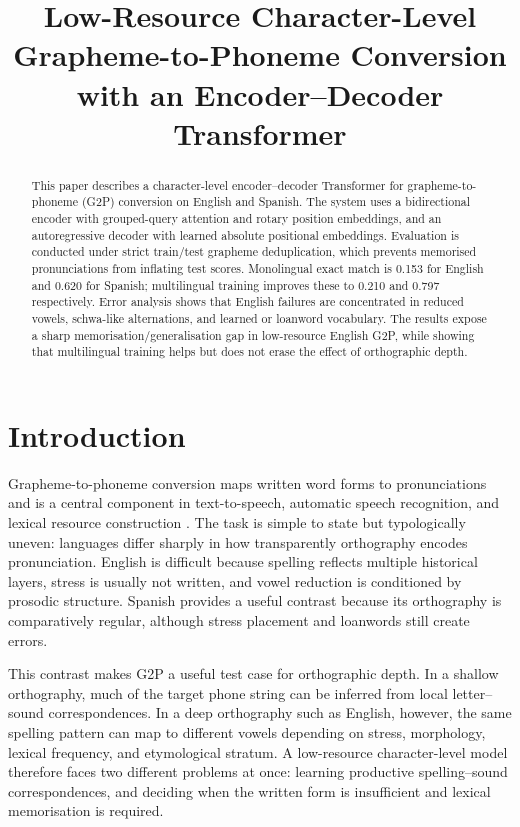 \documentclass[11pt]{article}
\title{Low-Resource Character-Level Grapheme-to-Phoneme Conversion with an Encoder--Decoder Transformer}
\begin{document}
\maketitle

\begin{abstract}
This paper describes a character-level encoder--decoder Transformer for
grapheme-to-phoneme (G2P) conversion on English and Spanish. The system uses a
bidirectional encoder with grouped-query attention and rotary position
embeddings, and an autoregressive decoder with learned absolute positional
embeddings. Evaluation is conducted under strict train/test grapheme
deduplication, which prevents memorised pronunciations from inflating test
scores. Monolingual exact match is 0.153 for English and 0.620 for Spanish;
multilingual training improves these to 0.210 and 0.797 respectively. Error
analysis shows that English failures are concentrated in reduced vowels,
schwa-like alternations, and learned or loanword vocabulary. The results expose
a sharp memorisation/generalisation gap in low-resource English G2P, while
showing that multilingual training helps but does not erase the effect of
orthographic depth.
\end{abstract}

\section{Introduction}
\label{sec:introduction}

Grapheme-to-phoneme conversion maps written word forms to pronunciations and is
a central component in text-to-speech, automatic speech recognition, and lexical
resource construction \citep{cheng2024survey}. The task is simple to state but
typologically uneven: languages differ sharply in how transparently orthography
encodes pronunciation. English is difficult because spelling reflects multiple
historical layers, stress is usually not written, and vowel reduction is
conditioned by prosodic structure. Spanish provides a useful contrast because
its orthography is comparatively regular, although stress placement and
loanwords still create errors.

This contrast makes G2P a useful test case for orthographic depth. In a shallow
orthography, much of the target phone string can be inferred from local
letter--sound correspondences. In a deep orthography such as English, however,
the same spelling pattern can map to different vowels depending on stress,
morphology, lexical frequency, and etymological stratum. A low-resource
character-level model therefore faces two different problems at once: learning
productive spelling--sound correspondences, and deciding when the written form
is insufficient and lexical memorisation is required.
\end{document}
